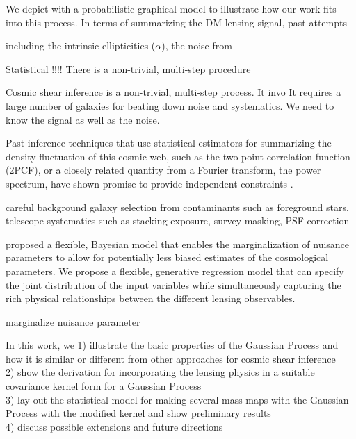 We depict with a probabilistic graphical model to illustrate how our work
fits into this process.
In terms of summarizing the DM lensing signal, past attempts   

 
including the intrinsic ellipticities ($\alpha$),
the noise from 

Statistical !!!!
There is a non-trivial, multi-step procedure 

Cosmic shear inference is a non-trivial, multi-step process. It invo 
It requires a large number of galaxies for beating down noise and systematics. 
We need to know the signal as well as the noise. 



Past inference techniques that use statistical estimators for summarizing the 
density fluctuation of this cosmic web, such as  
the two-point correlation function (2PCF), or a closely related quantity from a
Fourier transform, the power spectrum, have shown promise to provide 
independent constraints \citep{Jee2013a}.  

careful background galaxy selection from contaminants
such as foreground stars, telescope systematics such as stacking exposure, 
survey masking, PSF correction 


\cite{Schneider2014} proposed a flexible, Bayesian model that enables the
marginalization of nuisance parameters to allow for potentially less biased 
estimates of the cosmological parameters. 
We propose a flexible, generative regression model    
that can specify the joint distribution of the input variables while 
simultaneously capturing the rich physical relationships between the different
lensing observables.  



marginalize nuisance parameter 


In this work, we 
1) illustrate the basic properties of the Gaussian Process and how it is
similar or different from other approaches for cosmic shear inference  \\ 
2) show the derivation for incorporating the lensing physics in 
a suitable covariance kernel form for a Gaussian Process  \\
3) lay out the statistical model for making several mass maps 
with the Gaussian Process with the modified kernel and show preliminary results \\ 
4) discuss possible extensions and future directions 
 
